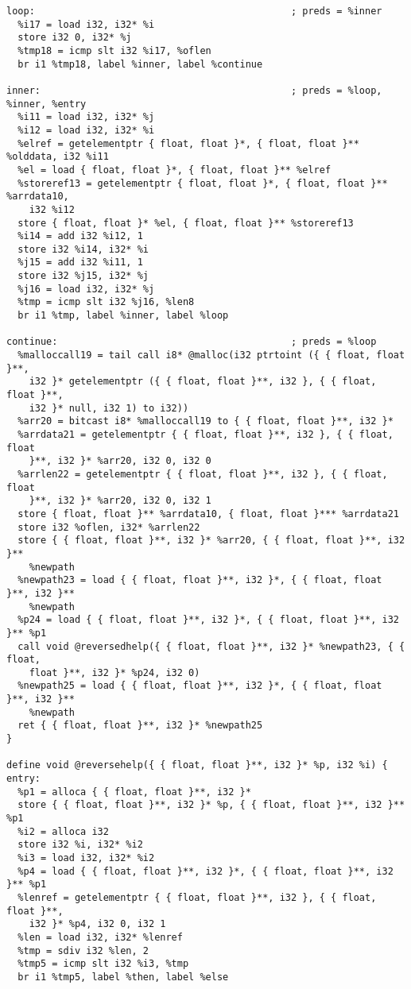 \documentclass[main.tex]{subfiles}
\begin{document}
{\begin{lstlisting}
loop:                                             ; preds = %inner
  %i17 = load i32, i32* %i
  store i32 0, i32* %j
  %tmp18 = icmp slt i32 %i17, %oflen
  br i1 %tmp18, label %inner, label %continue

inner:                                            ; preds = %loop, %inner, %entry
  %i11 = load i32, i32* %j
  %i12 = load i32, i32* %i
  %elref = getelementptr { float, float }*, { float, float }** %olddata, i32 %i11
  %el = load { float, float }*, { float, float }** %elref
  %storeref13 = getelementptr { float, float }*, { float, float }** %arrdata10, 
    i32 %i12
  store { float, float }* %el, { float, float }** %storeref13
  %i14 = add i32 %i12, 1
  store i32 %i14, i32* %i
  %j15 = add i32 %i11, 1
  store i32 %j15, i32* %j
  %j16 = load i32, i32* %j
  %tmp = icmp slt i32 %j16, %len8
  br i1 %tmp, label %inner, label %loop

continue:                                         ; preds = %loop
  %malloccall19 = tail call i8* @malloc(i32 ptrtoint ({ { float, float }**,
    i32 }* getelementptr ({ { float, float }**, i32 }, { { float, float }**,
    i32 }* null, i32 1) to i32))
  %arr20 = bitcast i8* %malloccall19 to { { float, float }**, i32 }*
  %arrdata21 = getelementptr { { float, float }**, i32 }, { { float, float 
    }**, i32 }* %arr20, i32 0, i32 0
  %arrlen22 = getelementptr { { float, float }**, i32 }, { { float, float 
    }**, i32 }* %arr20, i32 0, i32 1
  store { float, float }** %arrdata10, { float, float }*** %arrdata21
  store i32 %oflen, i32* %arrlen22
  store { { float, float }**, i32 }* %arr20, { { float, float }**, i32 }** 
    %newpath
  %newpath23 = load { { float, float }**, i32 }*, { { float, float }**, i32 }** 
    %newpath
  %p24 = load { { float, float }**, i32 }*, { { float, float }**, i32 }** %p1
  call void @reversedhelp({ { float, float }**, i32 }* %newpath23, { { float,
    float }**, i32 }* %p24, i32 0)
  %newpath25 = load { { float, float }**, i32 }*, { { float, float }**, i32 }** 
    %newpath
  ret { { float, float }**, i32 }* %newpath25
}

define void @reversehelp({ { float, float }**, i32 }* %p, i32 %i) {
entry:
  %p1 = alloca { { float, float }**, i32 }*
  store { { float, float }**, i32 }* %p, { { float, float }**, i32 }** %p1
  %i2 = alloca i32
  store i32 %i, i32* %i2
  %i3 = load i32, i32* %i2
  %p4 = load { { float, float }**, i32 }*, { { float, float }**, i32 }** %p1
  %lenref = getelementptr { { float, float }**, i32 }, { { float, float }**, 
    i32 }* %p4, i32 0, i32 1
  %len = load i32, i32* %lenref
  %tmp = sdiv i32 %len, 2
  %tmp5 = icmp slt i32 %i3, %tmp
  br i1 %tmp5, label %then, label %else


\end{lstlisting}}
\end{document}
